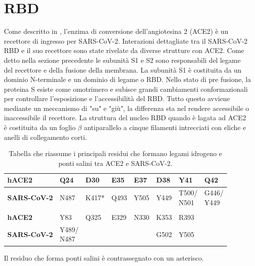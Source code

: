 \section{RBD}\label{sec:rbd}
Come descritto in \cite{RBDSpike}, l'enzima di conversione dell'angiotesina 2 (ACE2) è un recettore di ingresso per SARS-CoV-2. Interazioni dettagliate tra il SARS-CoV-2 RBD e il suo recettore sono state rivelate da diverse strutture con ACE2. Come detto nella sezione precedente le subunità S1 e S2 sono responsabili del legame del recettore e della fusione della membrana. La subunità S1 è costituita da un dominio N-terminale e un dominio di legame o RBD. Nello stato di pre fusione, la proteina S esiste come omotrimero e subisce grandi cambiamenti conformazionali per controllare l'esposizione e l'accessibilità del RBD. Tutto questo avviene mediante un meccanismo di "su" e "giù", la differenza sta nel rendere accessibile o inaccessibile il recettore. La struttura del nucleo RBD quando è lagata ad ACE2 è costituita da un foglio $\beta$ antiparallelo a cinque filamenti intrecciati con eliche e anelli di collegamento corti.

\begin{table}[H]
	\centering
	\selectfont
	\begin{tabularx}{0.85\textwidth}{|l|l|l|l|l|l|l|l|}
		\hline
		\textbf{\small hACE2} & \small Q24 & \small D30 & \small E35 & \small E37 & \small D38 & \small Y41 & \small Q42 \\ \hline
		\textbf{\small SARS-CoV-2} & \small N487 & \small K417* & \small Q493 & \small Y505 & \small Y449 & \parbox{0.6cm}{\small T500/\\N501} & \parbox{0.65cm}{\small G446/\\Y449 }\\ \hline
		& & & & & & & \\ \hline
		\textbf{\small hACE2} & \small Y83 & \small Q325 & \small E329 & \small N330 & \small K353 & \small R393 &\\ \hline
		\textbf{\small SARS-CoV-2} & \parbox{0.6cm}{\small Y489/\\N487} &  &  &  & \small G502 & \small Y505 &  \\ \hline
	\end{tabularx}
	\normalfont
	\caption{Tabella che riassume i principali residui che formano legami idrogeno e ponti salini tra ACE2 e SARS-CoV-2.}
	\label{tab:rtablega}
	\smallskip
	\begin{tablenotes}
		\item[\dag] Il residuo che forma ponti salini è contrassegnato con un asterisco.		
	\end{tablenotes}
\end{table}

